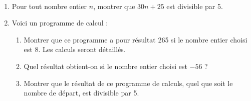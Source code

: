 \begin{exercice}[CRPE 2019 G3] %
\ \\ [-10mm]
   \begin{enumerate}
      \item Pour tout nombre entier $n$, montrer que $30n+25$ est divisible par 5.
      \item Voici un programme de calcul :
         \begin{center}
      \end{center}
      \vspace*{-4mm}
      \begin{enumerate}
         \item Montrer que ce programme a pour résultat 265 si le nombre entier choisi est 8. Les calculs seront détaillés.
         \item Quel résultat obtient-on si le nombre entier choisi est $-56$ ?
         \item Montrer que le résultat de ce programme de calculs, quel que soit le nombre de départ, est divisible par 5.
      \end{enumerate}
   \end{enumerate}
\end{exercice}

